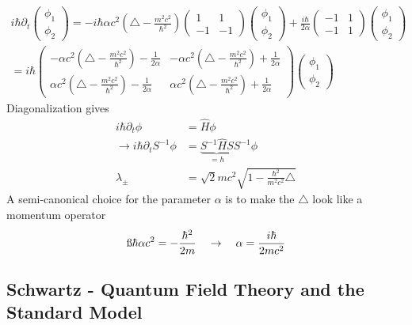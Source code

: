 \documentclass[10pt,a4paper]{article}
\theoremstyle{definition}
\begin{document}
\begin{align}
i\hbar\partial_t\begin{pmatrix}
\phi_1 \\
\phi_2 
\end{pmatrix}=-i\hbar\alpha c^2\left(\triangle-\frac{m^2c^2}{\hbar^2}\right)
\begin{pmatrix}
 1 &  1 \\
-1 & -1 
\end{pmatrix}\begin{pmatrix}
\phi_1 \\
\phi_2 
\end{pmatrix}
+\frac{i\hbar}{2\alpha}
\begin{pmatrix}
-1 &  1 \\
-1 &  1 
\end{pmatrix}
\begin{pmatrix}
\phi_1 \\
\phi_2 
\end{pmatrix}\\
=i\hbar\begin{pmatrix}
-\alpha c^2\left(\triangle-\frac{m^2c^2}{\hbar^2}\right)-\frac{1}{2\alpha} &  -\alpha c^2\left(\triangle-\frac{m^2c^2}{\hbar^2}\right)+\frac{1}{2\alpha} \\
\alpha c^2\left(\triangle-\frac{m^2c^2}{\hbar^2}\right)-\frac{1}{2\alpha} &  \alpha c^2\left(\triangle-\frac{m^2c^2}{\hbar^2}\right)+\frac{1}{2\alpha}
\end{pmatrix}
\begin{pmatrix}
\phi_1  \\
\phi_2  
\end{pmatrix}
\end{align}
Diagonalization gives
\begin{align}
    i\hbar\partial_t\phi&=\hat{H}\phi\\
    \rightarrow i\hbar\partial_tS^{-1}\phi&=\underbrace{S^{-1}\hat{H}S}_{=h}S^{-1}\phi\\
    \lambda_\pm&=\sqrt{2}mc^2\sqrt{1-\frac{\hbar^2}{m^2c^2}\triangle}
\end{align}
A semi-canonical choice for the parameter $\alpha$ is to make the $\triangle$ look like a momentum operator
\begin{align}
    \i\hbar\alpha c^2=-\frac{\hbar^2}{2m}\quad\rightarrow\quad\alpha=\frac{i\hbar}{2mc^2}
\end{align}

\subsection{{\sc Schwartz} - Quantum Field Theory and the Standard Model}
\end{document}
